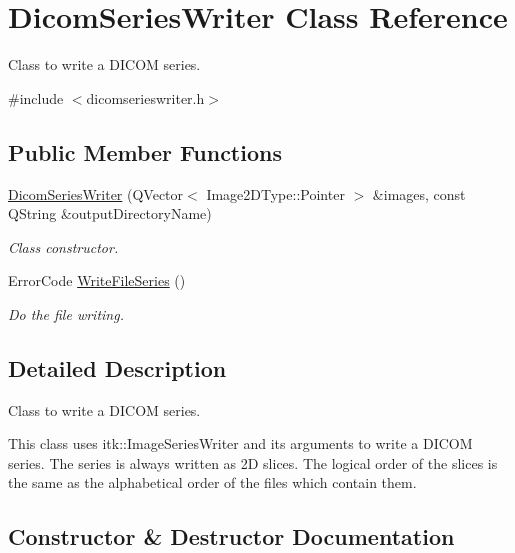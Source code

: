 \hypertarget{class_dicom_series_writer}{}\section{Dicom\+Series\+Writer Class Reference}
\label{class_dicom_series_writer}


Class to write a D\+I\+C\+OM series.  




{\ttfamily \#include $<$dicomserieswriter.\+h$>$}

\subsection*{Public Member Functions}
\begin{DoxyCompactItemize}
\item 
\hyperlink{class_dicom_series_writer_aeb69662aad2901c6118417d364656ebf}{Dicom\+Series\+Writer} (Q\+Vector$<$ Image2\+D\+Type\+::\+Pointer $>$ \&images, const Q\+String \&output\+Directory\+Name)
\begin{DoxyCompactList}\small\item\em Class constructor. \end{DoxyCompactList}\item 
Error\+Code \hyperlink{class_dicom_series_writer_ade0edd641e1c84ed8659205c78d772e1}{Write\+File\+Series} ()
\begin{DoxyCompactList}\small\item\em Do the file writing. \end{DoxyCompactList}\end{DoxyCompactItemize}


\subsection{Detailed Description}
Class to write a D\+I\+C\+OM series. 

This class uses itk\+::\+Image\+Series\+Writer and its arguments to write a D\+I\+C\+OM series. The series is always written as 2D slices. The logical order of the slices is the same as the alphabetical order of the files which contain them. 

\subsection{Constructor \& Destructor Documentation}
\mbox{\label{class_dicom_series_writer_aeb69662aad2901c6118417d364656ebf}} 
